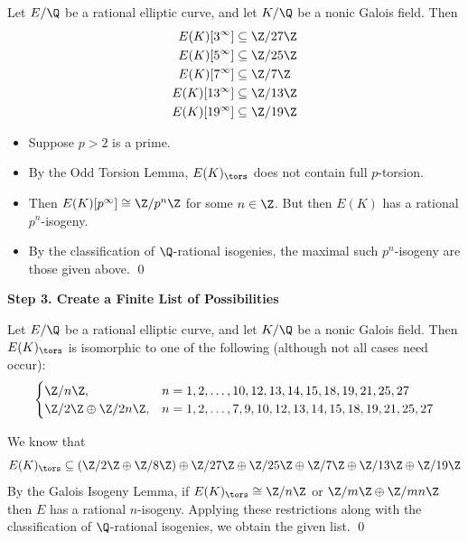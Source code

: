 \begin{frame}[plain,t]
\footnotesize
\begin{lem}
Let $E/\Q$ be a rational elliptic curve, and let $K/\Q$ be a nonic Galois field. Then
	\[
	\begin{aligned}
	E(K)[3^\infty]&\subseteq \Z/27\Z \\
	E(K)[5^\infty]&\subseteq \Z/25\Z \\
	E(K)[7^\infty]&\subseteq \Z/7\Z \\
	E(K)[13^\infty]&\subseteq \Z/13\Z \\
	E(K)[19^\infty]&\subseteq \Z/19\Z
	\end{aligned}
	\]
\end{lem}
\pf
\begin{itemize}
\item Suppose $p > 2$ is a prime. 
\item By the Odd Torsion Lemma, $E(K)_\tors$ does not contain full $p$-torsion. 
\item Then $E(K)[p^\infty] \cong \Z/p^n\Z$ for some $n \in \Z$. But then $E(K)$ has a rational $p^n$-isogeny. 
\item By the classification of $\Q$-rational isogenies, the maximal such $p^n$-isogeny are those given above. \hfill\qed
\end{itemize}
\end{frame}





\begin{frame}[plain]
\vfill
\begin{center} {\bfseries \Large \textcolor{UniGray}{Step 3. Create a Finite List of Possibilities}} \end{center}
\vfill 
\end{frame}





\begin{frame}[plain]
\footnotesize
\begin{prop}
Let $E/\Q$ be a rational elliptic curve, and let $K/\Q$ be a nonic Galois field. Then $E(K)_\tors$ is isomorphic to one of the following (although not all cases need occur):
	\[
	\begin{cases}
	\Z/n\Z, & n= 1, 2, \ldots, 10, 12, 13, 14, 15, 18, 19, 21, 25, 27 \\
	\Z/2\Z \oplus \Z/2n\Z, & n= 1, 2, \ldots, 7, 9, 10, 12, 13, 14, 15, 18, 19, 21, 25, 27
	\end{cases}
	\]
\end{prop} \pspace

\pf We know that 
	\[
	E(K)_\tors \subseteq (\Z/2\Z \oplus \Z/8\Z) \oplus \Z/27\Z \oplus \Z/25\Z \oplus \Z/7\Z \oplus \Z/13\Z \oplus \Z/19\Z
	\]
By the Galois Isogeny Lemma, if $E(K)_\tors \cong \Z/n\Z$ or $\Z/m\Z \oplus \Z/mn\Z$ then $E$ has a rational $n$-isogeny. Applying these restrictions along with the classification of $\Q$-rational isogenies, we obtain the given list. \hfill\qed
\end{frame}





